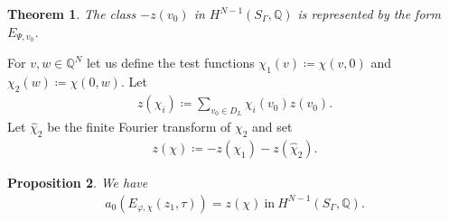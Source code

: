 \documentclass[a4paper,11pt]{amsart} %
\newcommand{\8}{\infty}
\newcommand{\Q}{\mathbb{Q}}
\theoremstyle{mytheoremstyle}
\newtheorem{thm}{Theorem}[section]
\newtheorem{prop}[thm]{Proposition}
\theoremstyle{remark}
\numberwithin{equation}{section}
\begin{document}
\begin{thm}  \cite[Theorem.~23]{bcg} The class $-z(v_0)$ in $H^{N-1}(S_\Gamma,\Q)$ is represented by the form $E_{\Psi,v_0}$.
\end{thm}
For $v,w \in \Q^N$ let us define the test functions $\chi_1(v) \coloneqq \chi(v,0)$ and $\chi_2(w) \coloneqq \chi(0,w)$. Let
\begin{align}
z(\chi_i)\coloneqq \sum_{v_0 \in D_L}\chi_i(v_0)z(v_0).
\end{align}
Let $\widehat{\chi}_2$ be the finite Fourier transform of $\chi_2$ and set
\begin{align}
z(\chi)\coloneqq -z(\chi_1)-z(\widehat{\chi}_2).
\end{align}

\begin{prop} \label{prop eulerclass} We have
\begin{align}
a_0(E_{\varphi, \chi}(z_1,\tau))=z(\chi) \ \textrm{in} \ H^{N-1}(S_\Gamma,\Q).
\end{align}
\end{prop}
\end{document}
